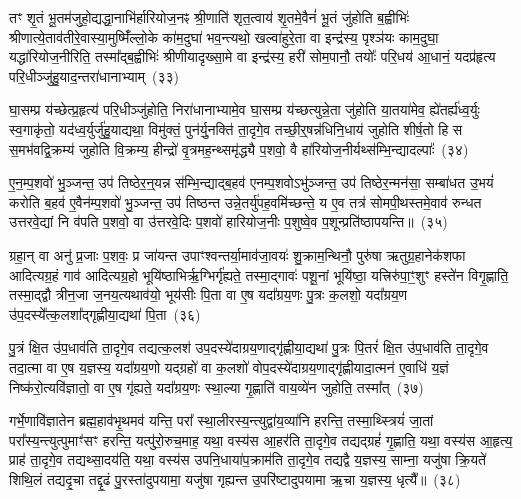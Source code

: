 तꣳ शृ॒तं भू॒तम॑जुहो॒द्यद्धा॒नाभि॑र्\mbox{}हारियोज॒नꣴ श्री॒णाति॑ शृत॒त्वाय॑ शृ॒तमे॒वैनं॑ भू॒तं जु॑होति ब॒ह्वीभिः॑ श्रीणात्ये॒ताव॑ती\-रे॒वास्या॒मुष्मिँ॑ल्लो॒के का॑म॒दुघा॑ भव॒न्त्यथो॒ खल्वा॑हुरे॒ता वा इन्द्र॑स्य॒ पृश्ञ॑यः काम॒दुघा॒ यद्धा॑रियोज॒नीरिति॒ तस्मा᳚द्ब॒ह्वीभिः॑ श्रीणीयादृख्सा॒मे वा इन्द्र॑स्य॒ हरी॑ सोम॒पानौ॒ तयोः᳚ परि॒धय॑ आ॒धानं॒ यदप्र॑हृत्य परि॒धीञ्जु॑हु॒याद॒न्तरा॑धानाभ्याम्~(३३)

घा॒सम्प्र य॑च्छेत्प्र॒हृत्य॑ परि॒धीञ्जु॑होति॒ निरा॑धानाभ्यामे॒व घा॒सम्प्र य॑च्छत्युन्ने॒ता जु॑होति या॒तया॑मेव॒ ह्ये॑तर्\mbox{}ह्य॑ध्व॒र्युः स्व॒गाकृ॑तो॒ यद॑ध्व॒र्युर्जु॑हु॒याद्यथा॒ विमु॑क्तं॒ पुन॑र्यु॒नक्ति॑ ता॒दृगे॒व तच्छी॒र्॒\mbox{}षन्न॑धिनि॒धाय॑ जुहोति शीर्\mbox{}ष॒तो हि स स॒मभ॑वद्वि॒क्रम्य॑ जुहोति वि॒क्रम्य॒ हीन्द्रो॑ वृ॒त्रमह॒न्थ्समृ॑द्ध्यै प॒शवो॒ वै हा॑रियोज॒नीर्यथ्स॑म्भि॒न्द्यादल्पाः᳚~(३४)

ए॒न॒म्प॒शवो॑ भु॒ञ्जन्त॒ उप॑ तिष्ठेर॒न्॒यन्न स॑म्भि॒न्द्याद्ब॒हव॑ एनम्प॒शवो\-ऽभु॑ञ्जन्त॒ उप॑ तिष्ठेर॒न्मन॑सा॒ सम्बा॑धत उ॒भयं॑ करोति ब॒हव॑ ए॒वैन॑म्प॒शवो॑ भु॒ञ्जन्त॒ उप॑ तिष्ठन्त उन्ने॒तर्यु॑पह॒वमि॑च्छन्ते॒ य ए॒व तत्र॑ सोमपी॒थस्तमे॒वाव॑ रुन्धत उत्तरवे॒द्यां नि व॑पति प॒शवो॒ वा उ॑त्तरवे॒दिः प॒शवो॑ हारियोज॒नीः प॒शुष्वे॒व प॒शून्प्रति॑\-ष्ठापयन्ति॥~(३५)

{\anuvakamend[{अ॒श्री॒णा॒द॒न्तरा॑धानाभ्या॒मल्पाः᳚ स्थापयन्ति}]}%

ग्रहा॒न् वा अनु॑ प्र॒जाः प॒शवः॒ प्र जा॑यन्त उपाꣳश्वन्तर्या॒माव॑जा॒वयः॑ शु॒क्राम॒न्थिनौ॒ पुरु॑षा ऋतुग्र॒हानेक॑शफा आदित्यग्र॒हं गाव॑ आदित्यग्र॒हो भूयि॑ष्ठाभिर्\mbox{}ऋ॒ग्भिर्गृ॑ह्यते॒ तस्मा॒द्गावः॑ पशू॒नां भूयि॑ष्ठा॒ यत्त्रिरु॑पा॒ꣳ॒शुꣳ हस्ते॑न विगृ॒ह्णाति॒ तस्मा॒द्द्वौ त्रीन॒जा ज॒नय॒त्यथाव॑यो॒ भूय॑सीः पि॒ता वा ए॒ष यदा᳚ग्रय॒णः पु॒त्रः क॒लशो॒ यदा᳚ग्रय॒ण उ॑प॒दस्ये᳚त्क॒लशा᳚द्गृह्णीया॒द्यथा॑ पि॒ता~(३६)

पु॒त्रं क्षि॒त उ॑प॒धाव॑ति ता॒दृगे॒व तद्यत्क॒लश॑ उप॒दस्ये॑दाग्रय॒णाद्गृ॑ह्णीया॒द्यथा॑ पु॒त्रः पि॒तरं॑ क्षि॒त उ॑प॒धाव॑ति ता॒दृगे॒व तदा॒त्मा वा ए॒ष य॒ज्ञस्य॒ यदा᳚ग्रय॒णो यद्ग्रहो॑ वा क॒लशो॑ वोप॒दस्ये॑दाग्रय॒णाद्गृ॑ह्णीयादा॒त्मन॑ ए॒वाधि॑ य॒ज्ञं निष्क॑रो॒त्यवि॑ज्ञातो॒ वा ए॒ष गृ॑ह्यते॒ यदा᳚ग्रय॒णः स्था॒ल्या गृ॒ह्णाति॑ वाय॒व्ये॑न जुहोति॒ तस्मा᳚त्~(३७)

गर्भे॒णावि॑ज्ञातेन ब्रह्म॒हाव॑भृ॒थमव॑ यन्ति॒ परा᳚ स्था॒लीरस्य॒न्त्युद्वा॑य॒व्या॑नि हरन्ति॒ तस्मा॒थ्स्त्रियं॑ जा॒तां परा᳚स्य॒न्त्यु\-त्पुमाꣳ॑सꣳ हरन्ति॒ यत्पु॑रो॒रुच॒माह॒ यथा॒ वस्य॑स आ॒हर॑ति ता॒दृगे॒व तद्यद्ग्रहं॑ गृ॒ह्णाति॒ यथा॒ वस्य॑स आ॒हृत्य॒ प्राह॑ ता॒दृगे॒व तद्यथ्सा॒दय॑ति॒ यथा॒ वस्य॑स उपनि॒धाया॑प॒क्राम॑ति ता॒दृगे॒व तद्यद्वै य॒ज्ञस्य॒ साम्ना॒ यजु॑षा क्रि॒यते॑ शिथि॒लं तद्यदृ॒चा तद्दृ॒ढं पु॒रस्ता॑दुपयामा॒ यजु॑षा गृह्यन्त उ॒परि॑ष्टादुपयामा ऋ॒चा य॒ज्ञस्य॒ धृत्यै᳚॥~(३८)

